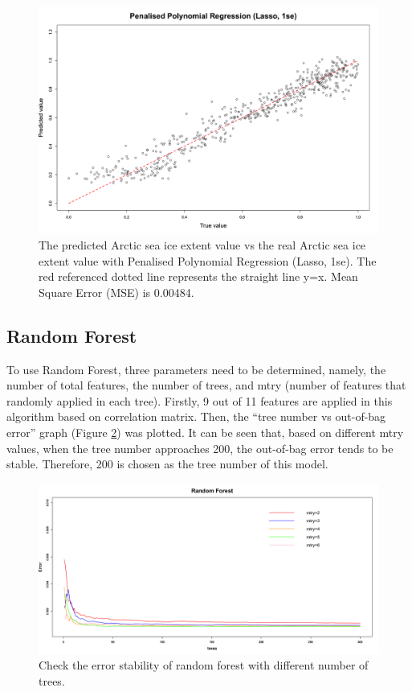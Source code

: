 \begin{figure}[htbp]
\centering
\includegraphics[width = 1.0\textwidth]{Figure/4.2.3-PPR-1se.png}
\caption{The predicted Arctic sea ice extent value vs the real Arctic sea ice extent value with Penalised Polynomial Regression (Lasso, 1se). The red referenced dotted line represents the straight line y=x. Mean Square Error (MSE) is 0.00484.}
\label{4.2.3-PPR-1se}
\end{figure}



\subsection{Random Forest} %

To use Random Forest, three parameters need to be determined, namely, the number of total features, the number of trees, and mtry (number of features that randomly applied in each tree). Firstly, 9 out of 11 features are applied in this algorithm based on correlation matrix. Then, the “tree number vs out-of-bag error” graph (Figure \ref{4.2.6-RF-200TreesStable}) was plotted. It can be seen that, based on different mtry values, when the tree number approaches 200, the out-of-bag error tends to be stable. Therefore, 200 is chosen as the tree number of this model.

\begin{figure}[htbp]
\centering
\includegraphics[width = 1.0\textwidth]{Figure/4.2.4-RF-200TreesStable.png}
\caption{Check the error stability of random forest with different number of trees.}
\label{4.2.6-RF-200TreesStable}
\end{figure}

